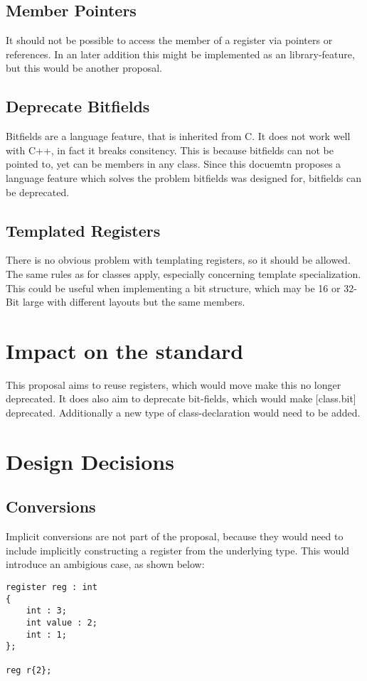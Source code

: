 \documentclass{scrreprt}
\begin{document}
\section{Member Pointers}
It should not be possible to access the member of a register via
pointers or references. In an later addition this might be implemented as an
library-feature, but this would be another proposal.
\section{Deprecate Bitfields}
Bitfields are a language feature, that is inherited from C. It does not work
well with C++, in fact it breaks consitency. This is because
bitfields can not be pointed to, yet can be members in any class.
Since this docuemtn proposes a language feature which
solves the problem bitfields was designed for, bitfields can be deprecated.
\section{Templated Registers}
There is no obvious problem with templating registers, so it should be allowed.
The same rules as for classes apply, especially concerning template
specialization.
This could be useful when implementing a bit structure, which may be 16 or
32-Bit large with different layouts but the same members.
\chapter{Impact on the standard}
This proposal aims to reuse registers, which would move make this no longer
deprecated. It does also aim to deprecate bit-fields, which would make
[class.bit] deprecated.
Additionally a new type of class-declaration would need to be added.

\chapter{Design Decisions}
\section{Conversions}
Implicit conversions are not part of the proposal, because they would need to
include implicitly constructing a register from the underlying type. This would
introduce an ambigious case, as shown below:

\begin{lstlisting}
register reg : int
{
	int : 3;
	int value : 2;
	int : 1;
};

reg r{2};
\end{lstlisting}
\end{document}
